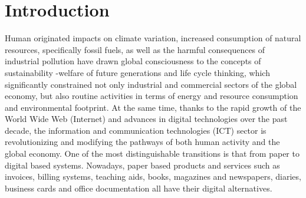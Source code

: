 \documentclass[3p,times,procedia]{elsarticle}
\begin{document}



\section{Introduction}

Human originated impacts on climate variation, increased consumption of natural resources, specifically fossil fuels, as well as the harmful consequences of industrial pollution have drawn global consciousness to the concepts of sustainability -welfare of future generations and life cycle thinking, which significantly constrained not only industrial and commercial sectors of the global economy, but also routine activities in terms of energy and resource consumption and environmental footprint. At the same time, thanks to the rapid growth of the World Wide Web (Internet) and advances in digital technologies over the past decade, the information and communication technologies (ICT) sector is revolutionizing and modifying the pathways of both human activity and the global economy. One of the most distinguishable transitions is that from paper to digital based systems. Nowadays, paper based products and services such as invoices, billing systems, teaching aids, books, magazines and newspapers, diaries, business cards and office documentation all have their digital alternatives.\\
\end{document}

